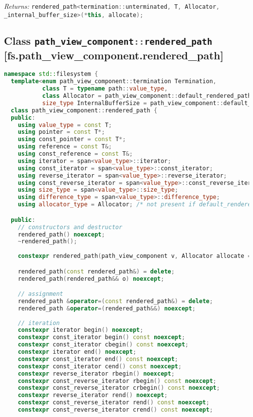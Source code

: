 \documentclass[11pt]{article}
\newcommand{\code}[2][cpp]{\lstinline[language=#1,basicstyle=\small\ttfamily]{#2}}
\newcommand{\desc}[1]{\textit{#1}}
\newcommand{\returns}{\desc{Returns: }}
\begin{document}
\returns \code{rendered_path<termination::unterminated, T, Allocator, _internal_buffer_size>(*this, allocate);}

\subsection*{Class \code{path_view_component::rendered_path} [fs.path\_view\_component.rendered\_path]}

\begin{lstlisting}[language=cpp]
namespace std::filesystem {
  template<enum path_view_component::termination Termination,
           class T = typename path::value_type,
           class Allocator = path_view_component::default_rendered_path_allocator<T>,
           size_type InternalBufferSize = path_view_component::default_internal_buffer_size>
  class path_view_component::rendered_path {
  public:
    using value_type = const T;
    using pointer = const T*;
    using const_pointer = const T*;
    using reference = const T&;
    using const_reference = const T&;
    using iterator = span<value_type>::iterator;
    using const_iterator = span<value_type>::const_iterator;
    using reverse_iterator = span<value_type>::reverse_iterator;
    using const_reverse_iterator = span<value_type>::const_reverse_iterator;
    using size_type = span<value_type>::size_type;
    using difference_type = span<value_type>::difference_type;
    using allocator_type = Allocator; /* not present if default_rendered_path_allocator tag type was used */

  public:
    // constructors and destructor
    rendered_path() noexcept;
    ~rendered_path();
    
    constexpr rendered_path(path_view_component v, Allocator allocate = Allocator());

    rendered_path(const rendered_path&) = delete;
    rendered_path(rendered_path&& o) noexcept;

    // assignment
    rendered_path &operator=(const rendered_path&) = delete;
    rendered_path &operator=(rendered_path&&) noexcept;
    
    // iteration
    constexpr iterator begin() noexcept;
    constexpr const_iterator begin() const noexcept;
    constexpr const_iterator cbegin() const noexcept;
    constexpr iterator end() noexcept;
    constexpr const_iterator end() const noexcept;
    constexpr const_iterator cend() const noexcept;
    constexpr reverse_iterator rbegin() noexcept;
    constexpr const_reverse_iterator rbegin() const noexcept;
    constexpr const_reverse_iterator crbegin() const noexcept;
    constexpr reverse_iterator rend() noexcept;
    constexpr const_reverse_iterator rend() const noexcept;
    constexpr const_reverse_iterator crend() const noexcept;


\end{lstlisting}
\end{document}
